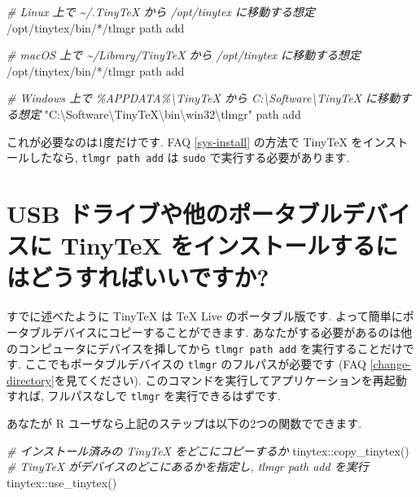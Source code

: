 \documentclass[
  xelatex,ja=standard,jafont=noto]{bxjsreport}
\newenvironment{Shaded}{\begin{snugshade}}{\end{snugshade}}
\newcommand{\CommentTok}[1]{\textcolor[rgb]{0.56,0.35,0.01}{\textit{#1}}}
\newcommand{\ExtensionTok}[1]{#1}
\newcommand{\FunctionTok}[1]{\textcolor[rgb]{0.00,0.00,0.00}{#1}}
\newcommand{\NormalTok}[1]{#1}
\newcommand{\SpecialCharTok}[1]{\textcolor[rgb]{0.00,0.00,0.00}{#1}}
\newcommand{\StringTok}[1]{\textcolor[rgb]{0.31,0.60,0.02}{#1}}
\begin{document}
\begin{Shaded}
\begin{Highlighting}[]
\CommentTok{\# Linux 上で \textasciitilde{}/.TinyTeX から /opt/tinytex に移動する想定}
\ExtensionTok{/opt/tinytex/bin/*/tlmgr}\NormalTok{ path add}

\CommentTok{\# macOS 上で \textasciitilde{}/Library/TinyTeX から /opt/tinytex に移動する想定}
\ExtensionTok{/opt/tinytex/bin/*/tlmgr}\NormalTok{ path add}

\CommentTok{\# Windows 上で \%APPDATA\%\textbackslash{}TinyTeX から C:\textbackslash{}Software\textbackslash{}TinyTeX に移動する想定}
\StringTok{"C:\textbackslash{}Software\textbackslash{}TinyTeX\textbackslash{}bin\textbackslash{}win32\textbackslash{}tlmgr"}\NormalTok{ path add}
\end{Highlighting}
\end{Shaded}

これが必要なのは1度だけです. FAQ \ref{sys-install} の方法で TinyTeX
をインストールしたなら, \texttt{tlmgr\ path\ add} は \texttt{sudo}
で実行する必要があります.

\hypertarget{usb-ux30c9ux30e9ux30a4ux30d6ux3084ux4ed6ux306eux30ddux30fcux30bfux30d6ux30ebux30c7ux30d0ux30a4ux30b9ux306b-tinytex-ux3092ux30a4ux30f3ux30b9ux30c8ux30fcux30ebux3059ux308bux306bux306fux3069ux3046ux3059ux308cux3070ux3044ux3044ux3067ux3059ux304b}{%
\section{USB ドライブや他のポータブルデバイスに TinyTeX
をインストールするにはどうすればいいですか?}\label{usb-ux30c9ux30e9ux30a4ux30d6ux3084ux4ed6ux306eux30ddux30fcux30bfux30d6ux30ebux30c7ux30d0ux30a4ux30b9ux306b-tinytex-ux3092ux30a4ux30f3ux30b9ux30c8ux30fcux30ebux3059ux308bux306bux306fux3069ux3046ux3059ux308cux3070ux3044ux3044ux3067ux3059ux304b}}

すでに述べたように TinyTeX は TeX Live のポータブル版です.
よって簡単にポータブルデバイスにコピーすることができます.
あなたがする必要があるのは他のコンピュータにデバイスを挿してから
\texttt{tlmgr\ path\ add} を実行することだけです.
ここでもポータブルデバイスの \texttt{tlmgr} のフルパスが必要です (FAQ
\ref{change-directory}を見てください).
このコマンドを実行してアプリケーションを再起動すれば, フルパスなしで
\texttt{tlmgr} を実行できるはずです.

あなたが R ユーザなら上記のステップは以下の2つの関数でできます.

\begin{Shaded}
\begin{Highlighting}[numbers=left,,]
\CommentTok{\# インストール済みの TinyTeX をどこにコピーするか}
\NormalTok{tinytex}\SpecialCharTok{::}\FunctionTok{copy\_tinytex}\NormalTok{()}
\CommentTok{\# TinyTeX がデバイスのどこにあるかを指定し, tlmgr path add を実行}
\NormalTok{tinytex}\SpecialCharTok{::}\FunctionTok{use\_tinytex}\NormalTok{()}
\end{Highlighting}
\end{Shaded}
\end{document}
